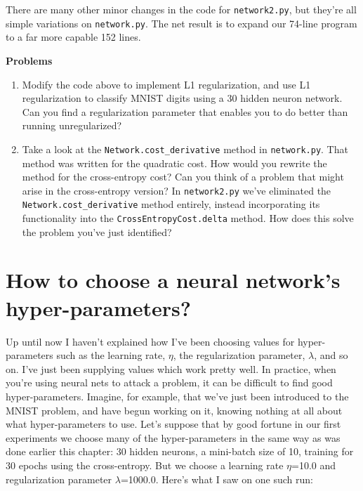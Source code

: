 There are many other minor changes in the code for \lstinline{network2.py}, but they're all simple variations on \lstinline{network.py}. The net result is to expand our 74-line program to a far more capable 152 lines.


\textbf{Problems}



\begin{enumerate}
\item Modify the code above to implement L1 regularization, and use L1 regularization to classify MNIST digits using a 30 hidden neuron network. Can you find a regularization parameter that enables you to do better than running unregularized?
\item Take a look at the \lstinline{Network.cost_derivative} method in \lstinline{network.py}. That method was written for the quadratic cost. How would you rewrite the method for the cross-entropy cost? Can you think of a problem that might arise in the cross-entropy version? In \lstinline{network2.py} we've eliminated the \lstinline{Network.cost_derivative} method entirely, instead incorporating its functionality into the \lstinline{CrossEntropyCost.delta} method. How does this solve the problem you've just identified?
\end{enumerate}

\section{How to choose a neural network's hyper-parameters?}
\label{sec:Howtochooseaneuralnetworkshyperparameters}
Up until now I haven't explained how I've been choosing values for hyper-parameters such as the learning rate, $\eta$, the regularization parameter, $\lambda$, and so on. I've just been supplying values which work pretty well. In practice, when you're using neural nets to attack a problem, it can be difficult to find good hyper-parameters. Imagine, for example, that we've just been introduced to the MNIST problem, and have begun working on it, knowing nothing at all about what hyper-parameters to use. Let's suppose that by good fortune in our first experiments we choose many of the hyper-parameters in the same way as was done earlier this chapter: 30 hidden neurons, a mini-batch size of 10, training for 30 epochs using the cross-entropy. But we choose a learning rate $\eta$=10.0 and regularization parameter $\lambda$=1000.0. Here's what I saw on one such run:


